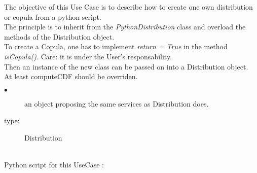 \renewcommand{\filename}{docUC_InputNoData_CustomDistFromPython.tex}
\renewcommand{\filetitle}{UC : Creation of a custom distribution or copula from the python script}

\HeaderIIILevel


\label{creation_distribution}

The objective of this Use Case is to describe how to create one own distribution or copula from a python script.\\


The principle is to inherit from the \textit{PythonDistribution} class and overload the methods of the Distribution object.\\
To create a Copula, one has to implement \emph{return = True} in the method {\itshape isCopula()}. Care: it is under the User's responsability.\\

Then an instance of the new class can be passed on into a Distribution object.\\
At least computeCDF should be overriden.

{
  \begin{description}
  \item[$\bullet$] an object proposing the same services as Distribution does.
  \item[type:] Distribution
  \end{description}
}

\textspace\\
Python script for this UseCase :

